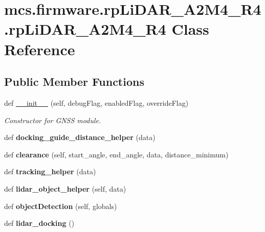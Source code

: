 \hypertarget{classmcs_1_1firmware_1_1rpLiDAR__A2M4__R4_1_1rpLiDAR__A2M4__R4}{}\section{mcs.\+firmware.\+rp\+Li\+D\+A\+R\+\_\+\+A2\+M4\+\_\+\+R4.\+rp\+Li\+D\+A\+R\+\_\+\+A2\+M4\+\_\+\+R4 Class Reference}
\label{classmcs_1_1firmware_1_1rpLiDAR__A2M4__R4_1_1rpLiDAR__A2M4__R4}
\subsection*{Public Member Functions}
\begin{DoxyCompactItemize}
\item 
def \hyperlink{classmcs_1_1firmware_1_1rpLiDAR__A2M4__R4_1_1rpLiDAR__A2M4__R4_a9dbead8425577c5451e602a4257a4ae8}{\+\_\+\+\_\+init\+\_\+\+\_\+} (self, debug\+Flag, enabled\+Flag, override\+Flag)
\begin{DoxyCompactList}\small\item\em Constructor for G\+N\+SS module. \end{DoxyCompactList}\item 
\mbox{\label{classmcs_1_1firmware_1_1rpLiDAR__A2M4__R4_1_1rpLiDAR__A2M4__R4_a43272ee37e9828e33bacb8ff049d6ed8}} 
def {\bfseries docking\+\_\+guide\+\_\+distance\+\_\+helper} (data)
\item 
\mbox{\label{classmcs_1_1firmware_1_1rpLiDAR__A2M4__R4_1_1rpLiDAR__A2M4__R4_adcd86509965efdf2cda38f1d2622ea08}} 
def {\bfseries clearance} (self, start\+\_\+angle, end\+\_\+angle, data, distance\+\_\+minimum)
\item 
\mbox{\label{classmcs_1_1firmware_1_1rpLiDAR__A2M4__R4_1_1rpLiDAR__A2M4__R4_a000aee80e2d12a59bc8780ca5cc7849a}} 
def {\bfseries tracking\+\_\+helper} (data)
\item 
\mbox{\label{classmcs_1_1firmware_1_1rpLiDAR__A2M4__R4_1_1rpLiDAR__A2M4__R4_a37f88d56c8d6fe5b0e7c88c5cc44284d}} 
def {\bfseries lidar\+\_\+object\+\_\+helper} (self, data)
\item 
\mbox{\label{classmcs_1_1firmware_1_1rpLiDAR__A2M4__R4_1_1rpLiDAR__A2M4__R4_a933872c9bd7624a083b92aa2c64ea223}} 
def {\bfseries object\+Detection} (self, globals)
\item 
\mbox{\label{classmcs_1_1firmware_1_1rpLiDAR__A2M4__R4_1_1rpLiDAR__A2M4__R4_a778ba3059ff2b301c46e325fac6ac3f0}} 
def {\bfseries lidar\+\_\+docking} ()
\end{DoxyCompactItemize}
